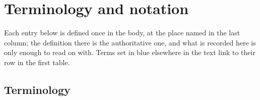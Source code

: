 %
%

\section*{Terminology and notation}

Each entry below is defined once in the body, at the place named in the last
column; the definition there is the authoritative one, and what is recorded
here is only enough to read on with.  Terms set in blue elsewhere in the text
link to their row in the first table.

\subsection*{Terminology}

